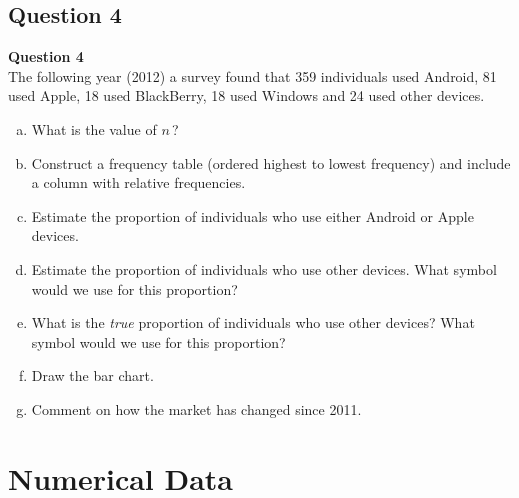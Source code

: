 \documentclass[compress]{beamer}        %
\makeatletter
\newcommand{\tcb}{\textcolor{beamer@blendedblue}}
\makeatother
\begin{document}
\subsection{Question 4}
\begin{frame}{\bf \tcb{Question 4}\\[-0.8cm]}
The following year (2012) a survey found that 359 individuals used Android, 81 used Apple, 18 used BlackBerry, 18 used Windows and 24 used other devices.\\[0.2cm]
\begin{enumerate}[a)]\itemsep0.1cm
\item What is the value of $n$\,?
\item Construct a frequency table (ordered highest to lowest frequency) and include a column with relative frequencies.
\item Estimate the proportion of individuals who use either Android or Apple devices.
\item Estimate the proportion of individuals who use other devices. What symbol would we use for this proportion?
\item What is the \emph{true} proportion of individuals who use other devices? What symbol would we use for this proportion?
\item Draw the bar chart.
\item Comment on how the market has changed since 2011.
\end{enumerate}
\end{frame}




\section{Numerical Data}
\end{document}

